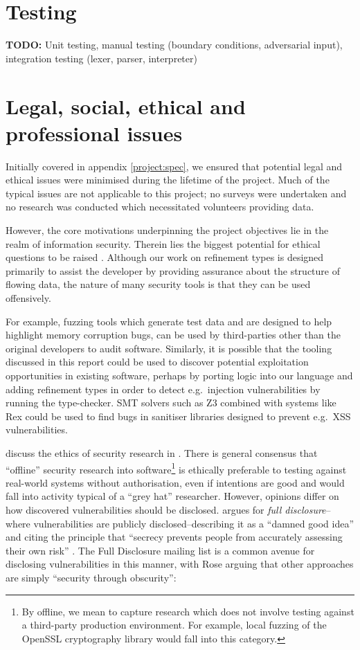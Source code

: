 \documentclass[a4paper,openany,12pt]{book}
\newcommand{\todobox}[1] {\colorbox{todocolor}{\parbox{\dimexpr \linewidth-\columnsep}{\vspace{.75\baselineskip}\centering\parbox{0.95\linewidth}{\faIcon{lightbulb} \textbf{TODO:} #1\vspace{.75\baselineskip}}}}}
\begin{document}
\chapter{Testing}

\todobox{Unit testing, manual testing (boundary conditions, adversarial input), integration testing (lexer, parser, interpreter)}

\chapter[Legal, social, ethical and professional issues]{Legal, social, ethical and\\professional issues}

Initially covered in appendix \ref{project:spec}, we ensured that potential legal and ethical issues were minimised
during the lifetime of the project.
Much of the typical issues are not applicable to this project; no surveys were undertaken and no research was
conducted which necessitated volunteers providing data.

However, the core motivations underpinning the project objectives lie in the realm of information security.
Therein lies the biggest potential for ethical questions to be raised \citep{dark2008ethics}.
Although our work on refinement types is designed primarily to assist the developer by providing assurance about the
structure of flowing data, the nature of many security tools is that they can be used offensively.

For example, fuzzing tools which generate test data and are designed to help highlight memory corruption bugs, can be
used by third-parties other than the original developers to audit software.
Similarly, it is possible that the tooling discussed in this report could be used to discover potential exploitation
opportunities in existing software, perhaps by porting logic into our language and adding refinement types in order to
detect e.g.\ injection vulnerabilities by running the type-checker.
SMT solvers such as Z3 combined with systems like Rex could be used to find bugs in sanitiser libraries designed to
prevent e.g.\ XSS vulnerabilities.

\citeauthor{harper2018gray} discuss the ethics of security research in \citet{harper2018gray}.
There is general consensus that ``offline'' security research into software\footnote{By offline, we mean to capture research which does not involve testing against a third-party production environment.
For example, local fuzzing of the OpenSSL cryptography library would fall into this category.} is ethically preferable
to testing against real-world systems without authorisation, even if intentions are good and would fall into activity
typical of a ``grey hat'' researcher.
However, opinions differ on how discovered vulnerabilities should be disclosed. \citeauthor{schneier2007fd} argues for
\textit{full disclosure}--where vulnerabilities are publicly disclosed--describing it as a ``damned good
idea'' and citing the principle that ``secrecy prevents people from accurately assessing their own risk'' \citep{schneier2007fd}.
The Full Disclosure mailing list is a common avenue for disclosing vulnerabilities in this manner, with Rose arguing
that other approaches are simply ``security through obscurity'':
\end{document}

